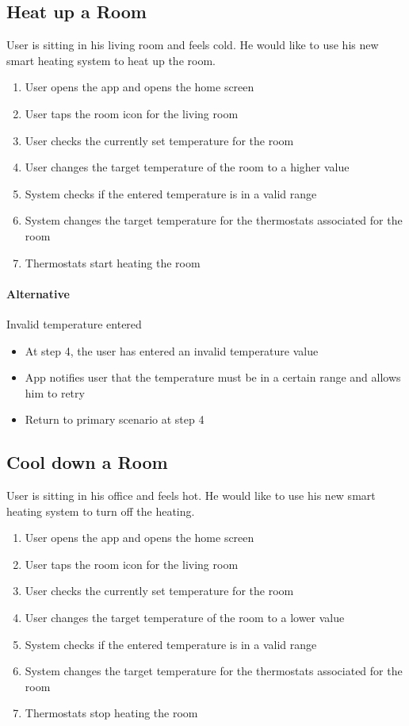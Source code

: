 \subsection*{Heat up a Room}
User is sitting in his living room and feels cold. He would like to use his new smart heating system to heat up the room.
\begin{enumerate}
    \item User opens the app and opens the home screen
    \item User taps the room icon for the living room
    \item User checks the currently set temperature for the room
    \item User changes the target temperature of the room to a higher value
    \item System checks if the entered temperature is in a valid range
    \item System changes the target temperature for the thermostats associated for the room
    \item Thermostats start heating the room
\end{enumerate}

\paragraph{Alternative} Invalid temperature entered
\begin{itemize}
    \item At step 4, the user has entered an invalid temperature value
    \item App notifies user that the temperature must be in a certain range and allows him to retry
    \item Return to primary scenario at step 4
\end{itemize}


\subsection*{Cool down a Room}
User is sitting in his office and feels hot. He would like to use his new smart heating system to turn off the heating.
\begin{enumerate}
    \item User opens the app and opens the home screen
    \item User taps the room icon for the living room
    \item User checks the currently set temperature for the room
    \item User changes the target temperature of the room to a lower value
    \item System checks if the entered temperature is in a valid range
    \item System changes the target temperature for the thermostats associated for the room
    \item Thermostats stop heating the room
\end{enumerate}

